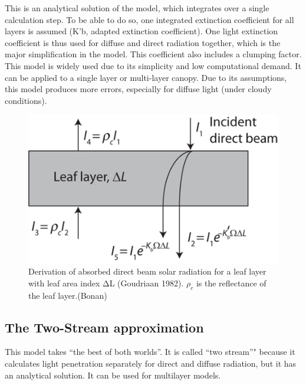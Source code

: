 \documentclass[12pt,oneside]{book}
\begin{document}
This is an analytical solution of the model, which integrates over a
single calculation step. To be able to do so, one integrated extinction
coefficient for all layers is assumed (K'b, adapted extinction
coefficient). One light extinction coefficient is thus used for diffuse
and direct radiation together, which is the major simplification in the
model. This coefficient also includes a clumping factor. This model is
widely used due to its simplicity and low computational demand. It can
be applied to a single layer or multi-layer canopy. Due to its
assumptions, this model produces more errors, especially for diffuse
light (under cloudy conditions).

\begin{figure}

{\centering \includegraphics[width=0.8\linewidth]{figures/chap3/f320_goudriaan} 

}

\caption{ Derivation of absorbed direct beam solar radiation for a leaf layer with leaf area index ΔL (Goudriaan 1982). $ρ_c$ is the reflectance of the leaf layer.(Bonan)}\label{fig:f320}
\end{figure}

\subsection{The Two-Stream
approximation}\label{the-two-stream-approximation}

This model takes ``the best of both worlds''. It is called ``two
stream''" because it calculates light penetration separately for direct
and diffuse radiation, but it has an analytical solution. It can be used
for multilayer models.
\end{document}
